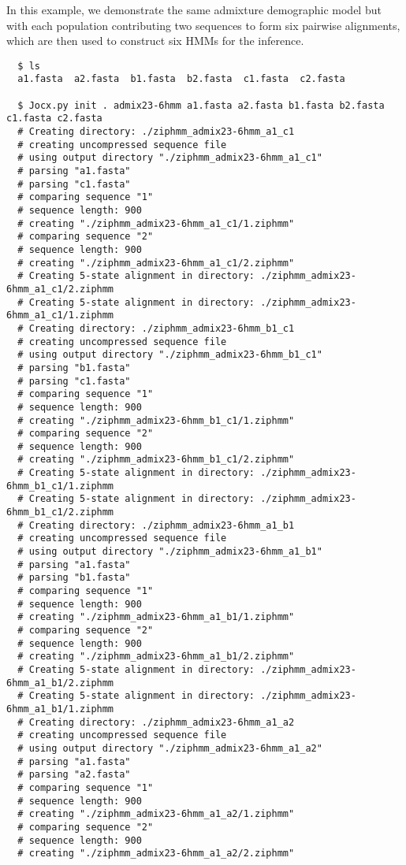In this example, we demonstrate the same admixture demographic model but with
each population contributing two sequences to form six pairwise alignments,
which are then used to construct six HMMs for the inference.

{\small{}\begin{verbatim}
  $ ls
  a1.fasta  a2.fasta  b1.fasta  b2.fasta  c1.fasta  c2.fasta

  $ Jocx.py init . admix23-6hmm a1.fasta a2.fasta b1.fasta b2.fasta c1.fasta c2.fasta
  # Creating directory: ./ziphmm_admix23-6hmm_a1_c1
  # creating uncompressed sequence file
  # using output directory "./ziphmm_admix23-6hmm_a1_c1"
  # parsing "a1.fasta"
  # parsing "c1.fasta"
  # comparing sequence "1"
  # sequence length: 900
  # creating "./ziphmm_admix23-6hmm_a1_c1/1.ziphmm"
  # comparing sequence "2"
  # sequence length: 900
  # creating "./ziphmm_admix23-6hmm_a1_c1/2.ziphmm"
  # Creating 5-state alignment in directory: ./ziphmm_admix23-6hmm_a1_c1/2.ziphmm
  # Creating 5-state alignment in directory: ./ziphmm_admix23-6hmm_a1_c1/1.ziphmm
  # Creating directory: ./ziphmm_admix23-6hmm_b1_c1
  # creating uncompressed sequence file
  # using output directory "./ziphmm_admix23-6hmm_b1_c1"
  # parsing "b1.fasta"
  # parsing "c1.fasta"
  # comparing sequence "1"
  # sequence length: 900
  # creating "./ziphmm_admix23-6hmm_b1_c1/1.ziphmm"
  # comparing sequence "2"
  # sequence length: 900
  # creating "./ziphmm_admix23-6hmm_b1_c1/2.ziphmm"
  # Creating 5-state alignment in directory: ./ziphmm_admix23-6hmm_b1_c1/1.ziphmm
  # Creating 5-state alignment in directory: ./ziphmm_admix23-6hmm_b1_c1/2.ziphmm
  # Creating directory: ./ziphmm_admix23-6hmm_a1_b1
  # creating uncompressed sequence file
  # using output directory "./ziphmm_admix23-6hmm_a1_b1"
  # parsing "a1.fasta"
  # parsing "b1.fasta"
  # comparing sequence "1"
  # sequence length: 900
  # creating "./ziphmm_admix23-6hmm_a1_b1/1.ziphmm"
  # comparing sequence "2"
  # sequence length: 900
  # creating "./ziphmm_admix23-6hmm_a1_b1/2.ziphmm"
  # Creating 5-state alignment in directory: ./ziphmm_admix23-6hmm_a1_b1/2.ziphmm
  # Creating 5-state alignment in directory: ./ziphmm_admix23-6hmm_a1_b1/1.ziphmm
  # Creating directory: ./ziphmm_admix23-6hmm_a1_a2
  # creating uncompressed sequence file
  # using output directory "./ziphmm_admix23-6hmm_a1_a2"
  # parsing "a1.fasta"
  # parsing "a2.fasta"
  # comparing sequence "1"
  # sequence length: 900
  # creating "./ziphmm_admix23-6hmm_a1_a2/1.ziphmm"
  # comparing sequence "2"
  # sequence length: 900
  # creating "./ziphmm_admix23-6hmm_a1_a2/2.ziphmm"

\end{verbatim}}

